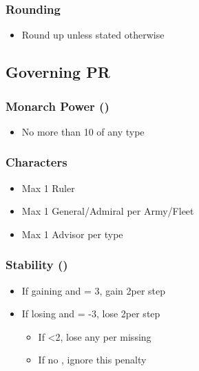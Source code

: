 \documentclass[10pt]{article}
\begin{document}
\subsubsection*{Rounding}
\begin{itemize}
	\item Round up unless stated otherwise
\end{itemize}

\subsection*{Governing PR }
\subsubsection*{Monarch Power (\monarchpower) }
\begin{itemize}
	\item No more than 10 \monarchpower of any type
\end{itemize}

\subsubsection*{Characters }
\begin{itemize}
	\item Max 1 Ruler
	\item Max 1 General/Admiral per Army/Fleet
	\item Max 1 Advisor per \monarchpower type
\end{itemize}

\subsubsection*{Stability (\stability) }
\begin{itemize}
	\item If gaining \stability and \stability = 3, gain 2\adminpower per step
	\item If losing \stability and \stability = -3, lose 2\adminpower per step
	\begin{itemize}
		\item If <2\adminpower, lose any \monarchpower per missing \adminpower
		\item If no \monarchpower, ignore this penalty
	\end{itemize}
\end{itemize}
\end{document}
